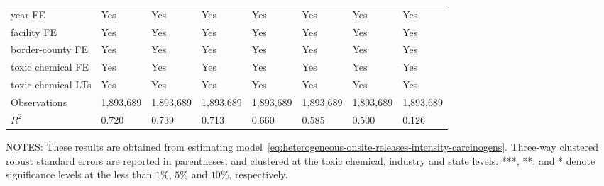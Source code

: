 \begin{table}[H]
{\begin{tabular}{@{}llllllll@{}}
            year FE                         & Yes       & Yes           & Yes       & Yes          & Yes             & Yes           & Yes                 \\
            facility FE                     & Yes       & Yes           & Yes       & Yes          & Yes             & Yes           & Yes                 \\
            border-county FE                & Yes       & Yes           & Yes       & Yes          & Yes             & Yes           & Yes                 \\
            toxic chemical FE               & Yes       & Yes           & Yes       & Yes          & Yes             & Yes           & Yes                 \\
            toxic chemical LTs              & Yes       & Yes           & Yes       & Yes          & Yes             & Yes           & Yes                 \\ \midrule
            Observations                    & 1,893,689 & 1,893,689     & 1,893,689 & 1,893,689    & 1,893,689       & 1,893,689     & 1,893,689           \\
            $R^2$                           & 0.720     & 0.739         & 0.713     & 0.660        & 0.585           & 0.500         & 0.126               \\ \bottomrule\bottomrule
        \end{tabular}%
    }
    \begin{minipage}{\columnwidth}
        \vspace{0.05in}
        \tiny NOTES: These results are obtained from estimating model~\ref{eq:heterogeneous-onsite-releases-intensity-carcinogens}. Three-way clustered robust standard errors are reported in parentheses, and clustered at the toxic chemical, industry and state levels. ***, **, and * denote significance levels at the less than $1\%$, $5\%$ and $10\%$, respectively.
    \end{minipage}
\end{table}